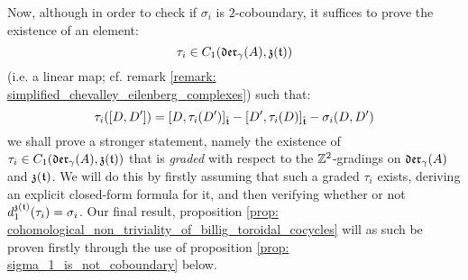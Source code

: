         Now, although in order to check if $\sigma_i$ is $2$-coboundary, it suffices to prove the existence of an element:
            $$\tau_i \in C_1(\mathfrak{der}_{\gamma}(A), \mathfrak{z}(\mathfrak{t}))$$
        (i.e. a linear map; cf. remark \ref{remark: simplified_chevalley_eilenberg_complexes}) such that:
            $$\tau_i([D, D']) = [D, \tau_i(D')]_{\hat{\mathfrak{t}}} - [D', \tau_i(D)]_{\hat{\mathfrak{t}}} - \sigma_i(D, D')$$
        we shall prove a stronger statement, namely the existence of $\tau_i \in C_1(\mathfrak{der}_{\gamma}(A), \mathfrak{z}(\mathfrak{t}))$ that is \textit{graded} with respect to the $\mathbb{Z}^2$-gradings on $\mathfrak{der}_{\gamma}(A)$ and $\mathfrak{z}(\mathfrak{t})$. We will do this by firstly assuming that such a graded $\tau_i$ exists, deriving an explicit closed-form formula for it, and then verifying whether or not $d_1^{\mathfrak{z}(\mathfrak{t})}(\tau_i) = \sigma_i$. Our final result, proposition \ref{prop: cohomological_non_triviality_of_billig_toroidal_cocycles} will as such be proven firstly through the use of proposition \ref{prop: sigma_1_is_not_coboundary} below.
